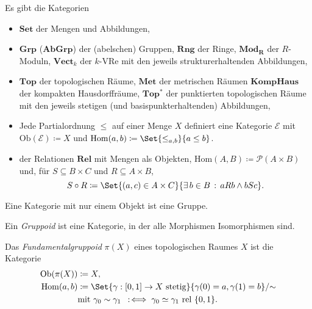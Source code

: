 \documentclass{cheat-sheet}
\newcommand{\rel}{\text{ rel }} %
\newcommand{\Ob}{\mathrm{Ob}} %
\newcommand{\Hom}{\mathrm{Hom}} %
\begin{document}
\begin{bspe}
  Es gibt die Kategorien
  \begin{itemize}
    \item $\mathbf{Set}$ der Mengen und Abbildungen,
    \item $\mathbf{Grp}$ ($\mathbf{AbGrp}$) der (abelschen) Gruppen, $\mathbf{Rng}$ der Ringe, $\mathbf{Mod_R}$ der $R$-Moduln, $\mathbf{Vect}_k$ der $k$-VRe mit den jeweils strukturerhaltenden Abbildungen,
    \item $\mathbf{Top}$ der topologischen Räume, $\mathbf{Met}$ der metrischen Räumen $\mathbf{KompHaus}$ der kompakten Hausdorffräume, $\mathbf{Top^*}$ der punktierten topologischen Räume mit den jeweils stetigen (und basispunkterhaltenden) Abbildungen,
    \item Jede Partialordnung $\leq$ auf einer Menge $X$ definiert eine Kategorie $\mathcal{E}$ mit $\Ob(\mathcal{E}) \coloneqq X$ und $\Hom(a, b) \coloneqq \Set{ {\leq}_{a,b} }{ a \leq b }$.
    \item der Relationen $\mathbf{Rel}$ mit Mengen als Objekten, $\Hom(A, B) \coloneqq \mathcal{P}(A \times B)$ und, für $S \subseteq B \times C$ und $R \subseteq A \times B$,
    \[ S \circ R \coloneqq \Set{ (a, c) \in A \times C }{ \ex{b \in B} aRb \wedge bSc }. \]
  \end{itemize}
\end{bspe}

\begin{bem}
  Eine Kategorie mit nur einem Objekt ist eine Gruppe.
\end{bem}

\begin{defn}
  Ein \emph{Gruppoid} ist eine Kategorie, in der alle Morphismen Isomorphismen sind.
\end{defn}

\begin{defn}
  Das \emph{Fundamentalgruppoid} $\pi(X)$ eines topologischen Raumes $X$ ist die Kategorie
  \begin{align*}
    \Ob(\pi(X)) & \coloneqq X,\\
    \Hom(a, b) & \coloneqq \Set{ \gamma : \I \to X \text{ stetig} }{ \gamma(0) = a, \gamma(1) = b }/{\sim}\\
    & \text{mit } \gamma_0 \sim \gamma_1 \coloniff \gamma_0 \simeq \gamma_1 \rel \{ 0, 1\}.
  \end{align*}
\end{defn}
\end{document}
